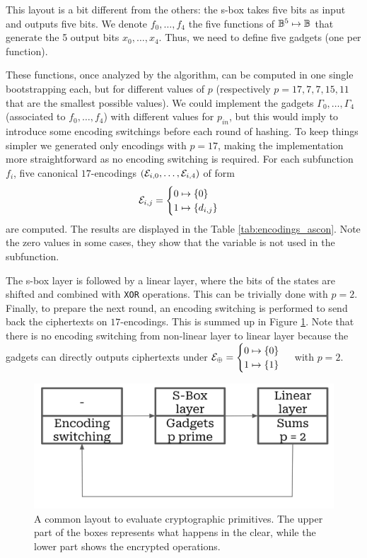 This layout is a bit different from the others: the s-box takes five bits as input and outputs five bits. We denote $f_0, \dots, f_4$ the five functions of $\mathbb{B}^5 \mapsto \mathbb{B}$ that generate the 5 output bits $x_0, \dots, x_4$. Thus, we need to define five gadgets (one per function).

These functions, once analyzed by the algorithm, can be computed in one single bootstrapping each, but for different values of $p$ (respectively $p=17, 7, 7, 15, 11$ that are the smallest possible values). We could implement the gadgets $\Gamma_0, \dots, \Gamma_4$ (associated to $f_0, \dots, f_4$) with different values for $p_{in}$, but this would imply to introduce some encoding switchings before each round of hashing. To keep things simpler we generated only encodings with $p = 17$, making the implementation more straightforward as no encoding switching is required. For each subfunction $f_i$, five canonical $17$-encodings $(\mathcal{E}_{i, 0}, \dots, \mathcal{E}_{i, 4})$ of form $$\mathcal{E}_{i, j} = \begin{cases} 0 \mapsto \{0\} \\ 1 \mapsto \{d_{i,j}\} \end{cases}$$ are computed. The results are displayed in the Table \ref{tab:encodings_ascon}. Note the zero values in some cases, they show that the variable is not used in the subfunction. 

The s-box layer is followed by a linear layer, where the bits of the states are shifted and combined with \texttt{XOR} operations. This can be trivially done with $p=2$. Finally, to prepare the next round, an encoding switching is performed to send back the ciphertexts on $17$-encodings. This is summed up in Figure \ref{fig:layout_spn}. Note that there is no encoding switching from non-linear layer to linear layer because the gadgets can directly outputs ciphertexts under $\mathcal{E}_\oplus = \begin{cases} 0 \mapsto \{0\} \\ 1 \mapsto \{1\} \end{cases}$ with $p=2$.

\begin{figure}
    \centering
    \includegraphics[width=0.5\linewidth]{img/to_harmonize/layout_spn.png}
    \caption{A common layout to evaluate cryptographic primitives. The upper part of the boxes represents what happens in the clear, while the lower part shows the encrypted operations. }
    \label{fig:layout_spn}
\end{figure}


